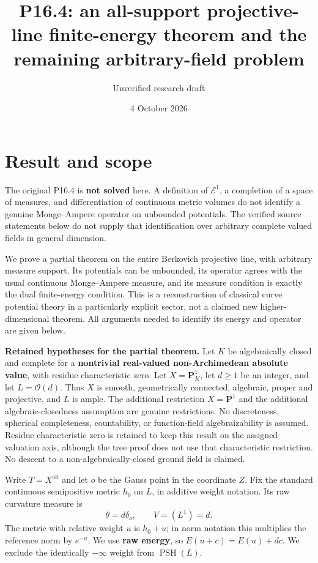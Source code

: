 \documentclass[
  11pt,
]{article}
\title{P16.4: an all-support projective-line finite-energy theorem and
the remaining arbitrary-field problem}
\author{Unverified research draft}
\date{4 October 2026}
\begin{document}
\maketitle

\section{Result and scope}\label{result-and-scope}

The original P16.4 is \textbf{not solved} here. A definition of
\(\mathcal E^1\), a completion of a space of measures, and
differentiation of continuous metric volumes do not identify a genuine
Monge--Ampere operator on unbounded potentials. The verified source
statements below do not supply that identification over arbitrary
complete valued fields in general dimension.

We prove a partial theorem on the entire Berkovich projective line, with
arbitrary measure support. Its potentials can be unbounded, its operator
agrees with the usual continuous Monge--Ampere measure, and its measure
condition is exactly the dual finite-energy condition. This is a
reconstruction of classical curve potential theory in a particularly
explicit sector, not a claimed new higher-dimensional theorem. All
arguments needed to identify its energy and operator are given below.

\textbf{Retained hypotheses for the partial theorem.} Let \(K\) be
algebraically closed and complete for a \textbf{nontrivial real-valued
non-Archimedean absolute value}, with residue characteristic zero. Let
\(X=\mathbf P^1_K\), let \(d\geq1\) be an integer, and let
\(L=\mathcal O(d)\). Thus \(X\) is smooth, geometrically connected,
algebraic, proper and projective, and \(L\) is ample. The additional
restriction \(X=\mathbf P^1\) and the additional algebraic-closedness
assumption are genuine restrictions. No discreteness, spherical
completeness, countability, or function-field algebraizability is
assumed. Residue characteristic zero is retained to keep this result on
the assigned valuation axis, although the tree proof does not use that
characteristic restriction. No descent to a non-algebraically-closed
ground field is claimed.

Write \(T=X^{\mathrm{an}}\) and let \(o\) be the Gauss point in the
coordinate \(Z\). Fix the standard continuous semipositive metric
\(h_0\) on \(L\), in additive weight notation. Its raw curvature measure
is \[
\theta=d\delta_o,\qquad V=(L^1)=d.
\] The metric with relative weight \(u\) is \(h_0+u\); in norm notation
this multiplies the reference norm by \(e^{-u}\). We use \textbf{raw
energy}, so \(E(u+c)=E(u)+dc\). We exclude the identically \(-\infty\)
weight from \(\operatorname{PSH}(L)\).
\end{document}

